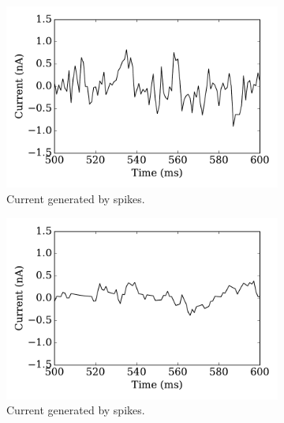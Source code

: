 \begin{figure}[tbp!]
		\label{Fig:spike_curr}
	\end{figure}
	
	\begin{figure}[tbp!]
		\centering
		  \par
		\begin{subfigure}[t]{0.43\textwidth}
			\includegraphics[width=\textwidth]{pics_iconip/curr_tau1.pdf}
			\caption{Current generated by spikes.}
		\end{subfigure}
		\begin{subfigure}[t]{0.43\textwidth}
			\includegraphics[width=\textwidth]{pics_iconip/curr_tau10.pdf}
			\caption{Current generated by spikes.}
		\end{subfigure}\\
		\begin{subfigure}[t]{0.43\textwidth}

\end{subfigure}
\end{figure}
